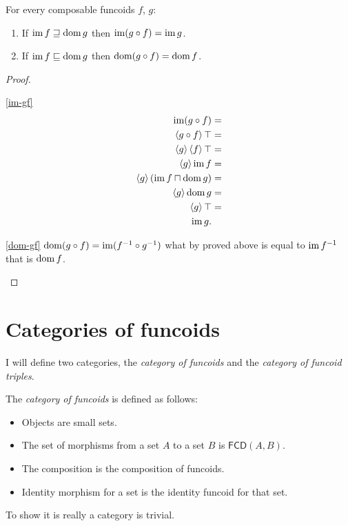 \begin{prop}
For every composable funcoids $f$, $g$:
\begin{enumerate}
\item \label{im-gf}If $\operatorname{im} f\sqsupseteq\operatorname{dom} g$ then $\operatorname{im}(g\circ f)=\operatorname{im} g$.
\item \label{dom-gf}If $\operatorname{im} f\sqsubseteq\operatorname{dom} g$ then $\operatorname{dom}(g\circ f)=\operatorname{dom} f$.
\end{enumerate}
\end{prop}
\begin{proof}
~
\begin{widedisorder}
\item [{\ref{im-gf}}] ~
\begin{align*}
\operatorname{im}(g\circ f) & =\\
\left\langle g\circ f\right\rangle\top & =\\
\left\langle g\right\rangle\left\langle f\right\rangle\top & =\\
\left\langle g\right\rangle\operatorname{im} f & =\\
\left\langle g\right\rangle(\operatorname{im} f\sqcap\operatorname{dom} g) & =\\
\left\langle g\right\rangle\operatorname{dom} g & =\\
\left\langle g\right\rangle\top & =\\
\operatorname{im} g.
\end{align*}

\item [{\ref{dom-gf}}] $\operatorname{dom}(g\circ f)=\operatorname{im}(f^{-1}\circ g^{-1})$ what
by proved above is equal to $\operatorname{im} f^{-1}$ that is $\operatorname{dom} f$.
\end{widedisorder}
\end{proof}
\section{Categories of funcoids}

I will define two categories, the \emph{category of funcoids} and
the \emph{category of funcoid triples}.

The \emph{category of funcoids} is defined
as follows:
\begin{itemize}
\item Objects are small sets.
\item The set of morphisms from a set $A$ to a set $B$ is $\mathsf{FCD}(A,B)$.
\item The composition is the composition of funcoids.
\item Identity morphism for a set is the identity funcoid for that set.
\end{itemize}
To show it is really a category is trivial.

